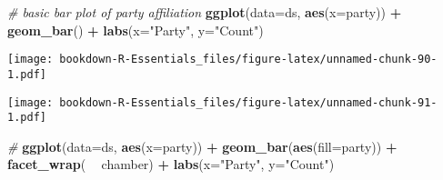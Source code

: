 \documentclass[
]{book}
\newenvironment{Shaded}{\begin{snugshade}}{\end{snugshade}}
\newcommand{\CommentTok}[1]{\textcolor[rgb]{0.56,0.35,0.01}{\textit{#1}}}
\newcommand{\DataTypeTok}[1]{\textcolor[rgb]{0.13,0.29,0.53}{#1}}
\newcommand{\KeywordTok}[1]{\textcolor[rgb]{0.13,0.29,0.53}{\textbf{#1}}}
\newcommand{\NormalTok}[1]{#1}
\newcommand{\OperatorTok}[1]{\textcolor[rgb]{0.81,0.36,0.00}{\textbf{#1}}}
\newcommand{\StringTok}[1]{\textcolor[rgb]{0.31,0.60,0.02}{#1}}
\begin{document}
\begin{Shaded}
\begin{Highlighting}[]
\CommentTok{# basic bar plot of party affiliation}
\KeywordTok{ggplot}\NormalTok{(}\DataTypeTok{data=}\NormalTok{ds, }\KeywordTok{aes}\NormalTok{(}\DataTypeTok{x=}\NormalTok{party)) }\OperatorTok{+}\StringTok{ }
\StringTok{  }\KeywordTok{geom_bar}\NormalTok{() }\OperatorTok{+}
\StringTok{  }\KeywordTok{labs}\NormalTok{(}\DataTypeTok{x=}\StringTok{"Party"}\NormalTok{, }\DataTypeTok{y=}\StringTok{"Count"}\NormalTok{)}
\end{Highlighting}
\end{Shaded}

\texttt{[image: bookdown-R-Essentials\_files/figure-latex/unnamed-chunk-90-1.pdf]}

\begin{Shaded}
\end{Shaded}

\texttt{[image: bookdown-R-Essentials\_files/figure-latex/unnamed-chunk-91-1.pdf]}

\begin{Shaded}
\begin{Highlighting}[]
\CommentTok{#}
\KeywordTok{ggplot}\NormalTok{(}\DataTypeTok{data=}\NormalTok{ds, }\KeywordTok{aes}\NormalTok{(}\DataTypeTok{x=}\NormalTok{party)) }\OperatorTok{+}\StringTok{ }
\StringTok{  }\KeywordTok{geom_bar}\NormalTok{(}\KeywordTok{aes}\NormalTok{(}\DataTypeTok{fill=}\NormalTok{party)) }\OperatorTok{+}
\StringTok{  }\KeywordTok{facet_wrap}\NormalTok{( }\OperatorTok{~}\StringTok{ }\NormalTok{chamber) }\OperatorTok{+}
\StringTok{  }\KeywordTok{labs}\NormalTok{(}\DataTypeTok{x=}\StringTok{"Party"}\NormalTok{, }\DataTypeTok{y=}\StringTok{"Count"}\NormalTok{)}
\end{Highlighting}
\end{Shaded}
\end{document}
